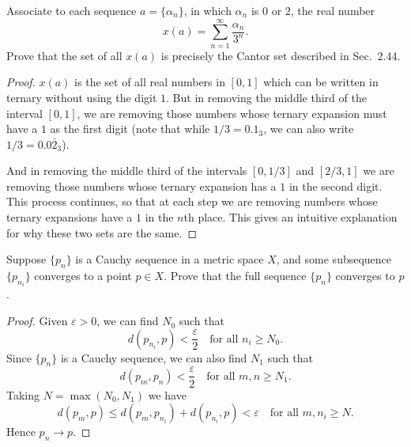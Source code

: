  Associate to each sequence $a = \{\alpha_n\}$, in which
$\alpha_n$ is $0$ or $2$, the real number
\begin{equation*}
  x(a) = \sum_{n=1}^\infty\frac{\alpha_n}{3^n}.
\end{equation*}
Prove that the set of all $x(a)$ is precisely the Cantor set described
in Sec.~2.44.
\begin{proof}
  $x(a)$ is the set of all real numbers in $[0,1]$ which can be
  written in ternary without using the digit $1$. But in removing the
  middle third of the interval $[0,1]$, we are removing those numbers
  whose ternary expansion must have a $1$ as the first digit (note
  that while $1/3 = 0.1_3$, we can also write $1/3 = 0.0\bar2_3$).

  And in removing the middle third of the intervals $[0,1/3]$ and
  $[2/3,1]$ we are removing those numbers whose ternary expansion has
  a $1$ in the second digit. This process continues, so that at each
  step we are removing numbers whose ternary expansions have a $1$ in
  the $n$th place. This gives an intuitive explanation for why these
  two sets are the same.
\end{proof}

 Suppose $\{p_n\}$ is a Cauchy sequence in a metric space
$X$, and some subsequence $\{p_{n_i}\}$ converges to a point $p\in
X$. Prove that the full sequence $\{p_n\}$ converges to $p$.
\begin{proof}
  Given $\varepsilon > 0$, we can find $N_0$ such that
  \begin{equation*}
    d(p_{n_i},p) < \frac\varepsilon2
    \quad\text{for all $n_i\geq N_0$}.
  \end{equation*}
  Since $\{p_n\}$ is a Cauchy sequence, we can also find $N_1$ such
  that
  \begin{equation*}
    d(p_m, p_n) < \frac\varepsilon2
    \quad\text{for all $m,n\geq N_1$}.
  \end{equation*}
  Taking $N = \max(N_0,N_1)$ we have
  \begin{equation*}
    d(p_m, p) \leq d(p_m, p_{n_i}) + d(p_{n_i}, p)
    < \varepsilon
    \quad\text{for all $m,n_i\geq N$}.
  \end{equation*}
  Hence $p_n\to p$.
\end{proof}
